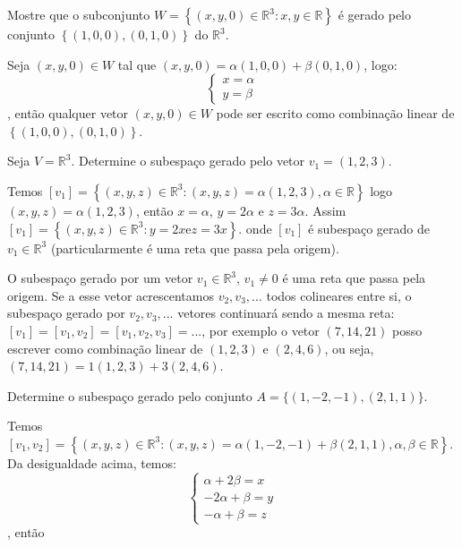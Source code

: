 \begin{ex}
Mostre que o subconjunto $W=\left\lbrace (x,y,0)\in \mathbb{R}^{3}: x,y\in \mathbb{R}\right\rbrace $ é gerado pelo conjunto $\left\lbrace (1,0,0), (0,1,0) \right\rbrace $ do $\mathbb{R}^{3}$.
\end{ex}

Seja $(x,y,0)\in W$ tal que $(x,y,0)=\alpha (1,0,0)+\beta(0,1,0)$, logo:
\begin{equation*}
\begin{cases}
x=\alpha   \\
y=\beta 
\end{cases}
\end{equation*}, então qualquer vetor $(x,y,0)\in W$ pode ser escrito como combinação linear de $\left\lbrace (1,0,0), (0,1,0) \right\rbrace $.
\begin{ex}
	Seja $V=\mathbb{R}^{3}$. Determine o subespaço gerado pelo vetor $v_{1}=(1,2,3)$.
\end{ex}
Temos $[v_{1}]=\left\lbrace (x,y,z)\in \mathbb{R}^{3}: (x,y,z)=\alpha (1,2,3), \alpha \in \mathbb{R} \right\rbrace $ logo $(x,y,z)=\alpha (1,2,3)$, então $x=\alpha$, $y=2\alpha$ e $z=3\alpha$. Assim $[v_{1}]=\left\lbrace (x,y,z)\in \mathbb{R}^{3}: y=2x \text{e} z=3x \right\rbrace $. onde $[v_{1}]$ é subespaço gerado de $v_{1}\in \mathbb{R}^{3}$ (particularmente é uma reta que passa pela origem).

O subespaço gerado por um vetor $v_{1}\in \mathbb{R}^{3}$, $v_{1}\neq 0$ é uma reta que passa pela origem. Se a esse vetor acrescentamos $v_{2},v_{3},...$ todos colineares entre si, o subespaço gerado por $v_{2}, v_{3},...$ vetores continuará sendo a mesma reta: $[v_{1}]=[v_{1},v_{2}]=[v_{1},v_{2},v_{3}]=...$, por exemplo o vetor $(7,14,21)$ posso escrever como combinação linear de $(1,2,3)$ e $(2,4,6)$, ou seja, $(7,14,21)=1(1,2,3)+3(2,4,6)$.

\begin{ex}
	Determine o subespaço gerado pelo conjunto $A=\{(1,-2,-1),(2,1,1)\}$.
\end{ex}
Temos $[v_{1},v_{2}]=\left\lbrace (x,y,z)\in\mathbb{R}^{3} : (x,y,z)=\alpha (1,-2,-1)+\beta (2,1,1), \alpha, \beta \in \mathbb{R}\right\rbrace $. Da desigualdade acima, temos:
\begin{equation*}
\begin{cases}
\alpha+2\beta=x   \\
-2\alpha+\beta=y \\
-\alpha+\beta=z 
\end{cases}
\end{equation*}, então 

